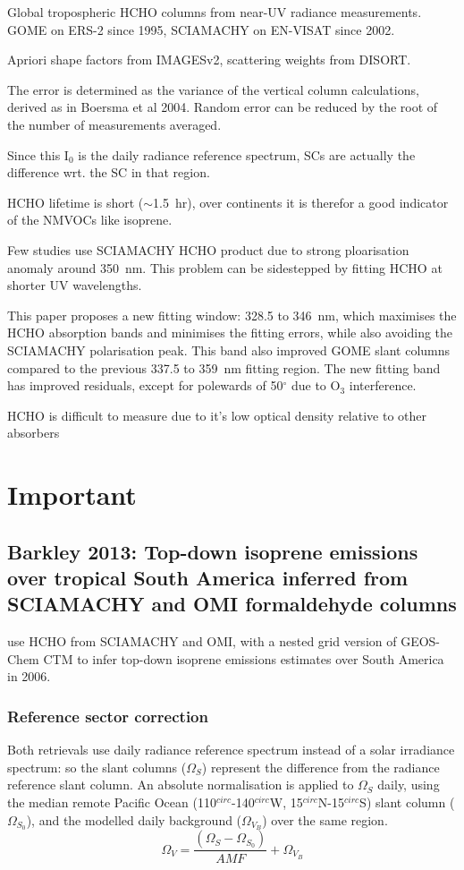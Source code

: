 \documentclass[11pt]{article} %
\begin{document}
  Global tropospheric HCHO columns from near-UV radiance measurements.
  GOME on ERS-2 since 1995, SCIAMACHY on EN-VISAT since 2002.
  
  Apriori shape factors from IMAGESv2, scattering weights from DISORT.
  
  The error is determined as the variance of the vertical column calculations, derived as in Boersma et al 2004.
  Random error can be reduced by the root of the number of measurements averaged.
  
  Since this I$_0$ is the daily radiance reference spectrum, SCs are actually the difference wrt. the SC in that region.
  
  HCHO lifetime is short ($\sim$1.5~hr), over continents it is therefor a good indicator of the NMVOCs like isoprene.
  
  Few studies use SCIAMACHY HCHO product due to strong ploarisation anomaly around 350~nm. 
  This problem can be sidestepped by fitting HCHO at shorter UV wavelengths.
  
  This paper proposes a new fitting window: 328.5 to 346~nm, which maximises the HCHO absorption bands and minimises the fitting errors, while also avoiding the SCIAMACHY polarisation peak.
  This band also improved GOME slant columns compared to the previous 337.5 to 359~nm fitting region.
  The new fitting band has improved residuals, except for polewards of 50$^{\circ}$ due to O$_3$ interference.
  
  HCHO is difficult to measure due to it's low optical density relative to other absorbers

\section{Important}
  \subsection{Barkley 2013: Top-down isoprene emissions over tropical South America inferred from SCIAMACHY and OMI formaldehyde columns}
    \citet{Barkley2013} use HCHO from SCIAMACHY and OMI, with a nested grid version of GEOS-Chem CTM to infer top-down isoprene emissions estimates over South America in 2006.
    
    \subsubsection{Reference sector correction}
      Both retrievals use daily radiance reference spectrum instead of a solar irradiance spectrum: so the slant columns ($\Omega_S$) represent the difference from the radiance reference slant column.
      An absolute normalisation is applied to $\Omega_S$ daily, using the median remote Pacific Ocean (110$^{circ}$-140$^{circ}$W, 15$^{circ}$N-15$^{circ}$S) slant column ($\Omega_{S_0}$), and the modelled daily background ($\Omega_{V_B}$) over the same region.
      \begin{equation*}
        \Omega_V = \frac{ \left( \Omega_S - \Omega_{S_0} \right) }{ AMF } + \Omega_{V_B}
      \end{equation*}
      
\end{document}

